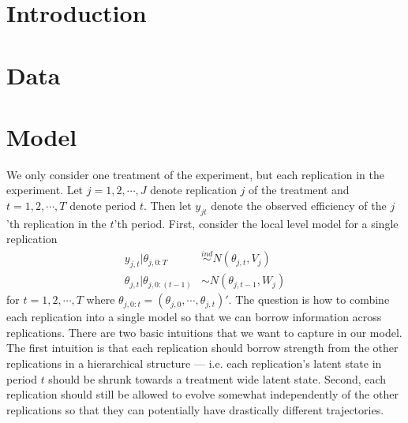 \documentclass[graybox]{svmult}
\begin{document}
\section{Introduction}\label{sec:intro}
\cite{simpson2014interweaving} \cite{crockett2009exchange} \cite{kimbrough2010exchange}
\section{Data}

\section{Model}
We only consider one treatment of the experiment, but each replication in the experiment. Let $j=1,2,\cdots,J$ denote replication $j$ of the treatment and $t=1,2,\cdots,T$ denote period $t$. Then let $y_{jt}$ denote the observed efficiency of the $j$'th replication in the $t$'th period. First, consider the local level model for a single replication
\begin{align*}
y_{j,t}|\theta_{j,0:T}&\stackrel{ind}{\sim}N(\theta_{j,t},V_j)\\
\theta_{j,t}|\theta_{j,0:(t-1)}&\sim N(\theta_{j,t-1},W_j)
\end{align*}
for $t=1,2,\cdots,T$ where $\theta_{j,0:t}=(\theta_{j,0},\cdots,\theta_{j,t})'$. The question is how to combine each replication into a single model so that we can borrow information across replications. There are two basic intuitions that we want to capture in our model. The first intuition is that each replication should borrow strength from the other replications in a hierarchical structure --- i.e. each replication's latent state in period $t$ should be shrunk towards a treatment wide latent state. Second, each replication should still be allowed to evolve somewhat independently of the other replications so that they can potentially have drastically different trajectories.
\end{document}
